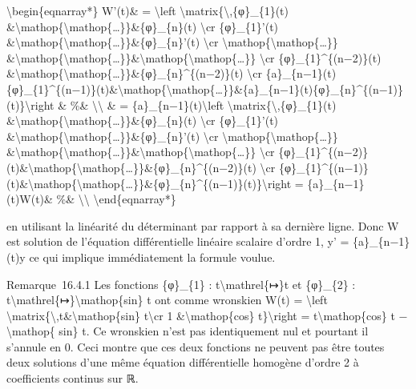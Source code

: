 \documentclass[]{article}
\begin{document}
\textbackslash{}begin\{eqnarray*\} W'(t)\& = \textbackslash{}left
\textbar{}\textbackslash{}matrix\{\textbackslash{},\{φ\}\_\{1\}(t)
\&\textbackslash{}mathop\{\textbackslash{}mathop\{\ldots{}\}\}\&\{φ\}\_\{n\}(t)
\textbackslash{}cr \{φ\}\_\{1\}'(t)
\&\textbackslash{}mathop\{\textbackslash{}mathop\{\ldots{}\}\}\&\{φ\}\_\{n\}'(t)
\textbackslash{}cr
\textbackslash{}mathop\{\textbackslash{}mathop\{\ldots{}\}\}
\&\textbackslash{}mathop\{\textbackslash{}mathop\{\ldots{}\}\}\&\textbackslash{}mathop\{\textbackslash{}mathop\{\ldots{}\}\}
\textbackslash{}cr \{φ\}\_\{1\}\^{}\{(n−2)\}(t)
\&\textbackslash{}mathop\{\textbackslash{}mathop\{\ldots{}\}\}\&\{φ\}\_\{n\}\^{}\{(n−2)\}(t)
\textbackslash{}cr
\{a\}\_\{n−1\}(t)\{φ\}\_\{1\}\^{}\{(n−1)\}(t)\&\textbackslash{}mathop\{\textbackslash{}mathop\{\ldots{}\}\}\&\{a\}\_\{n−1\}(t)\{φ\}\_\{n\}\^{}\{(n−1)\}(t)\}\textbackslash{}right
\textbar{} \& \%\& \textbackslash{}\textbackslash{} \& =
\{a\}\_\{n−1\}(t)\textbackslash{}left
\textbar{}\textbackslash{}matrix\{\textbackslash{},\{φ\}\_\{1\}(t)
\&\textbackslash{}mathop\{\textbackslash{}mathop\{\ldots{}\}\}\&\{φ\}\_\{n\}(t)
\textbackslash{}cr \{φ\}\_\{1\}'(t)
\&\textbackslash{}mathop\{\textbackslash{}mathop\{\ldots{}\}\}\&\{φ\}\_\{n\}'(t)
\textbackslash{}cr
\textbackslash{}mathop\{\textbackslash{}mathop\{\ldots{}\}\}
\&\textbackslash{}mathop\{\textbackslash{}mathop\{\ldots{}\}\}\&\textbackslash{}mathop\{\textbackslash{}mathop\{\ldots{}\}\}
\textbackslash{}cr
\{φ\}\_\{1\}\^{}\{(n−2)\}(t)\&\textbackslash{}mathop\{\textbackslash{}mathop\{\ldots{}\}\}\&\{φ\}\_\{n\}\^{}\{(n−2)\}(t)
\textbackslash{}cr
\{φ\}\_\{1\}\^{}\{(n−1)\}(t)\&\textbackslash{}mathop\{\textbackslash{}mathop\{\ldots{}\}\}\&\{φ\}\_\{n\}\^{}\{(n−1)\}(t)\}\textbackslash{}right
\textbar{} = \{a\}\_\{n−1\}(t)W(t)\& \%\&
\textbackslash{}\textbackslash{} \textbackslash{}end\{eqnarray*\}

en utilisant la linéarité du déterminant par rapport à sa dernière
ligne. Donc W est solution de l'équation différentielle linéaire
scalaire d'ordre 1, y' = \{a\}\_\{n−1\}(t)y ce qui implique
immédiatement la formule voulue.

Remarque~16.4.1 Les fonctions \{φ\}\_\{1\} :
t\textbackslash{}mathrel\{↦\}t et \{φ\}\_\{2\} :
t\textbackslash{}mathrel\{↦\}\textbackslash{}mathop\{sin\} t ont comme
wronskien W(t) = \textbackslash{}left
\textbar{}\textbackslash{}matrix\{\textbackslash{},t\&\textbackslash{}mathop\{sin\}
t\textbackslash{}cr 1 \&\textbackslash{}mathop\{cos\}
t\}\textbackslash{}right \textbar{} = t\textbackslash{}mathop\{cos\} t
−\textbackslash{}mathop\{ sin\} t. Ce wronskien n'est pas identiquement
nul et pourtant il s'annule en 0. Ceci montre que ces deux fonctions ne
peuvent pas être toutes deux solutions d'une même équation
différentielle homogène d'ordre 2 à coefficients continus sur ℝ.
\end{document}

